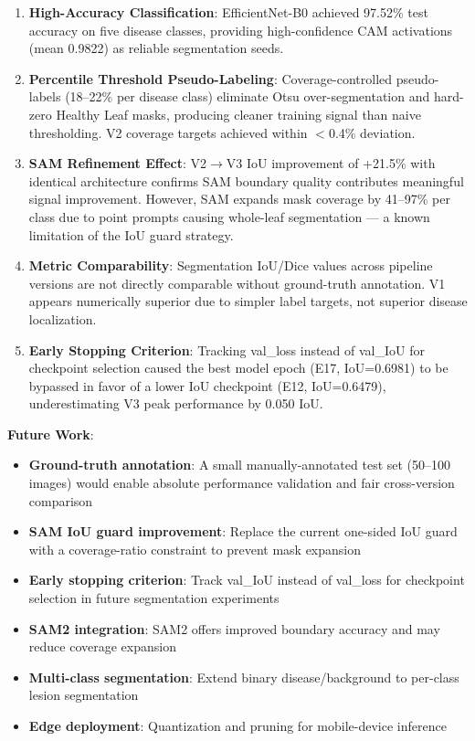 \documentclass[10pt,a4paper]{article}
\begin{document}
\begin{enumerate}
\item \textbf{High-Accuracy Classification}: EfficientNet-B0 achieved 97.52\% test accuracy on five disease classes, providing high-confidence CAM activations (mean 0.9822) as reliable segmentation seeds.

\item \textbf{Percentile Threshold Pseudo-Labeling}: Coverage-controlled pseudo-labels (18--22\% per disease class) eliminate Otsu over-segmentation and hard-zero Healthy Leaf masks, producing cleaner training signal than naive thresholding. V2 coverage targets achieved within $<$0.4\% deviation.

\item \textbf{SAM Refinement Effect}: V2$\to$V3 IoU improvement of +21.5\% with identical architecture confirms SAM boundary quality contributes meaningful signal improvement. However, SAM expands mask coverage by 41--97\% per class due to point prompts causing whole-leaf segmentation --- a known limitation of the IoU guard strategy.

\item \textbf{Metric Comparability}: Segmentation IoU/Dice values across pipeline versions are not directly comparable without ground-truth annotation. V1 appears numerically superior due to simpler label targets, not superior disease localization.

\item \textbf{Early Stopping Criterion}: Tracking val\_loss instead of val\_IoU for checkpoint selection caused the best model epoch (E17, IoU=0.6981) to be bypassed in favor of a lower IoU checkpoint (E12, IoU=0.6479), underestimating V3 peak performance by 0.050 IoU.
\end{enumerate}

\textbf{Future Work}:
\begin{itemize}
\item \textbf{Ground-truth annotation}: A small manually-annotated test set (50--100 images) would enable absolute performance validation and fair cross-version comparison
\item \textbf{SAM IoU guard improvement}: Replace the current one-sided IoU guard with a coverage-ratio constraint to prevent mask expansion
\item \textbf{Early stopping criterion}: Track val\_IoU instead of val\_loss for checkpoint selection in future segmentation experiments
\item \textbf{SAM2 integration}: SAM2 offers improved boundary accuracy and may reduce coverage expansion
\item \textbf{Multi-class segmentation}: Extend binary disease/background to per-class lesion segmentation
\item \textbf{Edge deployment}: Quantization and pruning for mobile-device inference
\end{itemize}
\end{document}
